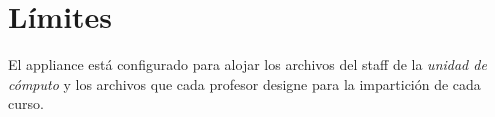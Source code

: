 
\begin{table}[H]
\caption{Versiones de software utilizados para el appliance}{}
\label{tab:versiones-software}
\noindent{} %
\end{table}

      \section {L\'{i}mites}

El appliance est\'{a} configurado para alojar los archivos del staff de la \textit{unidad de c\'{o}mputo} y los archivos que cada profesor designe para la impartici\'{o}n de cada curso.

\begin{table}[H]
\caption{Limites establecidos en el appliance}{}
\label{tab:limites-appliance}
\noindent{} %
\end{table}

